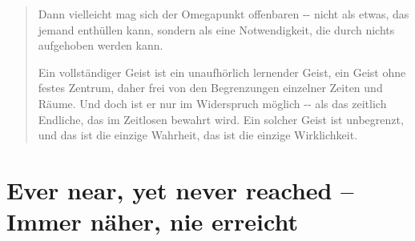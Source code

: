 \documentclass[
  ngerman,
]{article}
\begin{document}
\begin{quote}
Dann vielleicht mag sich der Omegapunkt offenbaren -\/- nicht als etwas,
das jemand enthüllen kann, sondern als eine Notwendigkeit, die durch
nichts aufgehoben werden kann.

Ein vollständiger Geist ist ein unaufhörlich lernender Geist, ein Geist
ohne festes Zentrum, daher frei von den Begrenzungen einzelner Zeiten
und Räume. Und doch ist er nur im Widerspruch möglich -\/- als das
zeitlich Endliche, das im Zeitlosen bewahrt wird. Ein solcher Geist ist
unbegrenzt, und das ist die einzige Wahrheit, das ist die einzige
Wirklichkeit.
\end{quote}

\section{\texorpdfstring{\textbf{Ever near, yet never reached -- Immer
näher, nie
erreicht}}{Ever near, yet never reached -- Immer näher, nie erreicht}}\label{ever-near-yet-never-reached-immer-nuxe4her-nie-erreicht}
\end{document}
